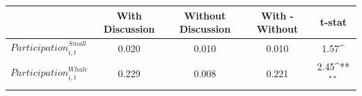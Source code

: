 {
\def\sym#1{\ifmmode^{#1}\else\(^{#1}\)\fi}
\begin{tabular}{l*{1}{cccc}}
\toprule
                    &With Discussion&Without Discussion&With - Without&      t-stat         \\
\midrule
$\mathit{Participation}^{Small}_{i,t}$&           0.020&           0.010&          0.010&            1.57\sym{}\\
$\mathit{Participation}^{Whale}_{i,t}$&           0.229&           0.008&          0.221&            2.45\sym{**}\\
\bottomrule
\end{tabular}
}
